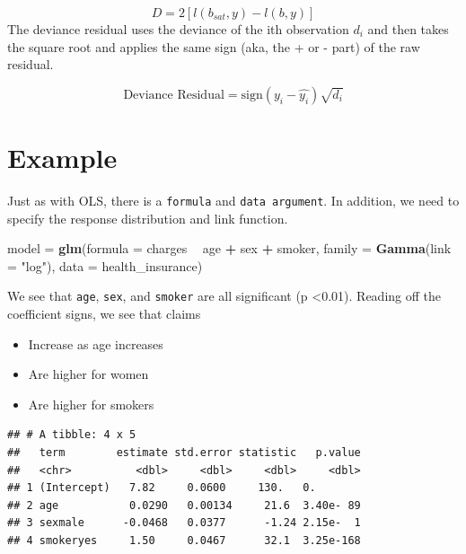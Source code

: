 \documentclass[openany]{book}
\newenvironment{Shaded}{\begin{snugshade}}{\end{snugshade}}
\newcommand{\DataTypeTok}[1]{\textcolor[rgb]{0.13,0.29,0.53}{#1}}
\newcommand{\KeywordTok}[1]{\textcolor[rgb]{0.13,0.29,0.53}{\textbf{#1}}}
\newcommand{\NormalTok}[1]{#1}
\newcommand{\OperatorTok}[1]{\textcolor[rgb]{0.81,0.36,0.00}{\textbf{#1}}}
\newcommand{\StringTok}[1]{\textcolor[rgb]{0.31,0.60,0.02}{#1}}
\providecommand{\tightlist}{%
  \setlength{\itemsep}{0pt}\setlength{\parskip}{0pt}}
\begin{document}
\[D = 2[l(b_{sat},y) - l(b,y)]\]
The deviance residual uses the deviance of the ith observation \(d_i\) and then takes the square root and applies the same sign (aka, the + or - part) of the raw residual.

\[\text{Deviance Residual} = \text{sign}(y_i - \hat{y_i})\sqrt{d_i}\]

\hypertarget{example-1}{%
\section{Example}\label{example-1}}

Just as with OLS, there is a \texttt{formula} and \texttt{data\ argument}. In addition, we need to specify the response distribution and link function.

\begin{Shaded}
\begin{Highlighting}[]
\NormalTok{model =}\StringTok{ }\KeywordTok{glm}\NormalTok{(}\DataTypeTok{formula =}\NormalTok{ charges }\OperatorTok{~}\StringTok{ }\NormalTok{age }\OperatorTok{+}\StringTok{ }\NormalTok{sex }\OperatorTok{+}\StringTok{ }\NormalTok{smoker, }
            \DataTypeTok{family =} \KeywordTok{Gamma}\NormalTok{(}\DataTypeTok{link =} \StringTok{"log"}\NormalTok{),}
            \DataTypeTok{data =}\NormalTok{ health_insurance)}
\end{Highlighting}
\end{Shaded}

We see that \texttt{age}, \texttt{sex}, and \texttt{smoker} are all significant (p \textless0.01). Reading off the coefficient signs, we see that claims

\begin{itemize}
\tightlist
\item
  Increase as age increases
\item
  Are higher for women
\item
  Are higher for smokers
\end{itemize}

\begin{Shaded}
\end{Shaded}

\begin{verbatim}
## # A tibble: 4 x 5
##   term        estimate std.error statistic   p.value
##   <chr>          <dbl>     <dbl>     <dbl>     <dbl>
## 1 (Intercept)   7.82     0.0600     130.   0.       
## 2 age           0.0290   0.00134     21.6  3.40e- 89
## 3 sexmale      -0.0468   0.0377      -1.24 2.15e-  1
## 4 smokeryes     1.50     0.0467      32.1  3.25e-168
\end{verbatim}
\end{document}
